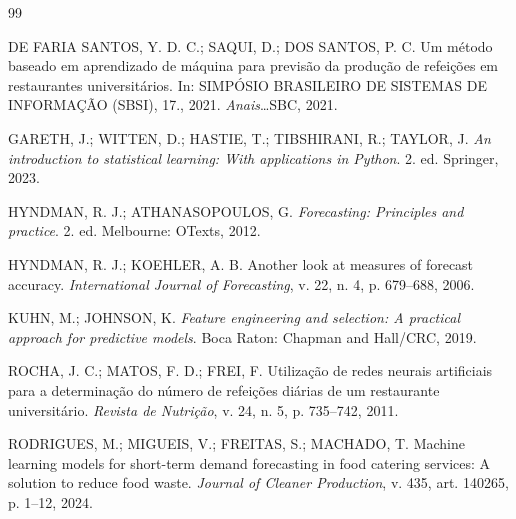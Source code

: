 \documentclass[11pt,a4paper]{article}
\begin{document}
\begin{thebibliography}{99}

DE FARIA SANTOS, Y. D. C.; SAQUI, D.; DOS SANTOS, P. C. Um método baseado em aprendizado de máquina para previsão da produção de refeições em restaurantes universitários. In: SIMPÓSIO BRASILEIRO DE SISTEMAS DE INFORMAÇÃO (SBSI), 17., 2021. \textit{Anais}\ldots SBC, 2021.

GARETH, J.; WITTEN, D.; HASTIE, T.; TIBSHIRANI, R.; TAYLOR, J. \textit{An introduction to statistical learning: With applications in Python}. 2. ed. Springer, 2023.

HYNDMAN, R. J.; ATHANASOPOULOS, G. \textit{Forecasting: Principles and practice}. 2. ed. Melbourne: OTexts, 2012.

HYNDMAN, R. J.; KOEHLER, A. B. Another look at measures of forecast accuracy. \textit{International Journal of Forecasting}, v. 22, n. 4, p. 679--688, 2006.

KUHN, M.; JOHNSON, K. \textit{Feature engineering and selection: A practical approach for predictive models}. Boca Raton: Chapman and Hall/CRC, 2019.

ROCHA, J. C.; MATOS, F. D.; FREI, F. Utilização de redes neurais artificiais para a determinação do número de refeições diárias de um restaurante universitário. \textit{Revista de Nutrição}, v. 24, n. 5, p. 735--742, 2011.

RODRIGUES, M.; MIGUEIS, V.; FREITAS, S.; MACHADO, T. Machine learning models for short-term demand forecasting in food catering services: A solution to reduce food waste. \textit{Journal of Cleaner Production}, v. 435, art. 140265, p. 1--12, 2024.

\end{thebibliography}
\end{document}
